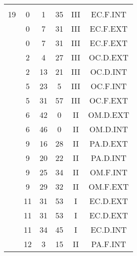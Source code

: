 \documentclass[12pt, a4paper]{article}
\begin{document}
\begin{multicols}{3}
{\begin{tabular}{c c c c c c}
	 	 	 	 & & & & & \\%
	 	 	 	19 & 0 & 1 & 35 & III & EC.F.INT\\%
	 	 	 	 & 0 & 7 & 31 & III & EC.F.EXT\\%
	 	 	 	 & 0 & 7 & 31 & III & EC.F.EXT\\%
	 	 	 	 & 2 & 4 & 27 & III & OC.D.EXT\\%
	 	 	 	 & 2 & 13 & 21 & III & OC.D.INT\\%
	 	 	 	 & 5 & 23 & 5 & III & OC.F.INT\\%
	 	 	 	 & 5 & 31 & 57 & III & OC.F.EXT\\%
	 	 	 	 & 6 & 42 & 0 & II & OM.D.EXT\\%
	 	 	 	 & 6 & 46 & 0 & II & OM.D.INT\\%
	 	 	 	 & 9 & 16 & 28 & II & PA.D.EXT\\%
	 	 	 	 & 9 & 20 & 22 & II & PA.D.INT\\%
	 	 	 	 & 9 & 25 & 34 & II & OM.F.INT\\%
	 	 	 	 & 9 & 29 & 32 & II & OM.F.EXT\\%
	 	 	 	 & 11 & 31 & 53 & I & EC.D.EXT\\%
	 	 	 	 & 11 & 31 & 53 & I & EC.D.EXT\\%
	 	 	 	 & 11 & 34 & 45 & I & EC.D.INT\\%
	 	 	 	 & 12 & 3 & 15 & II & PA.F.INT\\%
	 	 \end{tabular}
 	}
\end{multicols}
\end{document}

